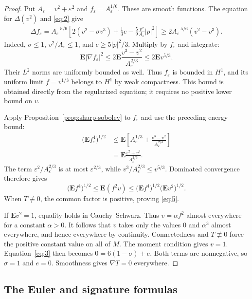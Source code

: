\begin{proof}
Put $A_\varepsilon=v^2+\varepsilon^2$ and
$f_\varepsilon=A_\varepsilon^{1/6}$. These are smooth functions.
The equation for $\Delta(v^2)$ and \eqref{eq:2} give
\[
 \begin{aligned}
 \Delta f_\varepsilon
 =A_\varepsilon^{-5/6}
 \left[
  2(v^2-\sigma v^3)+\frac13e
       -\frac59\frac{v^2}{A_\varepsilon}|p|^2
 \right]
 \ge 2A_\varepsilon^{-5/6}(v^2-v^3).
 \end{aligned}
\]
Indeed, $\sigma\le1$, $v^2/A_\varepsilon\le1$, and
$e\ge5|p|^2/3$. Multiply by $f_\varepsilon$ and integrate:
\[
 \mathbf E|\nabla f_\varepsilon|^2
 \le 2\mathbf E\frac{v^3-v^2}{A_\varepsilon^{2/3}}
 \le 2\mathbf E v^{5/3}.
\]
Their $L^2$ norms are uniformly bounded as well.
Thus $f_\varepsilon$ is bounded in $H^1$, and its uniform limit
$f=v^{1/3}$ belongs to $H^1$ by weak compactness. This bound is
obtained directly from the regularized equation; it requires no
positive lower bound on $v$.

Apply Proposition~\ref{prop:sharp-sobolev} to $f_\varepsilon$
and use the preceding energy bound:
\[
 \begin{aligned}
 \bigl(\mathbf E f_\varepsilon^4\bigr)^{1/2}
 &\le \mathbf E\left[
       A_\varepsilon^{1/3}
       +\frac{v^3-v^2}{A_\varepsilon^{2/3}}\right]\\
 &=\mathbf E\frac{\varepsilon^2+v^3}{A_\varepsilon^{2/3}}.
 \end{aligned}
\]
The term $\varepsilon^2/A_\varepsilon^{2/3}$ is at most
$\varepsilon^{2/3}$, while
$v^3/A_\varepsilon^{2/3}\le v^{5/3}$.
Dominated convergence therefore gives
\[
 \bigl(\mathbf E f^4\bigr)^{1/2}
 \le\mathbf E(f^2v)
 \le\bigl(\mathbf E f^4\bigr)^{1/2}
       \bigl(\mathbf E v^2\bigr)^{1/2}.
\]
When $T\not\equiv0$, the common factor is positive, proving
\eqref{eq:5}.

If $\mathbf E v^2=1$, equality holds in Cauchy--Schwarz.
Thus $v=\alpha f^2$ almost everywhere for a constant $\alpha>0$.
It follows that $v$ takes only the values $0$ and $\alpha^3$
almost everywhere, and hence everywhere by continuity.
Connectedness and $T\not\equiv0$ force the positive constant value
on all of $M$. The moment condition gives $v=1$.
Equation~\eqref{eq:3} then becomes
$0=6(1-\sigma)+e$. Both terms are nonnegative, so
$\sigma=1$ and $e=0$. Smoothness gives $\nabla T=0$ everywhere.
\end{proof}

\subsection{The Euler and signature formulas}

